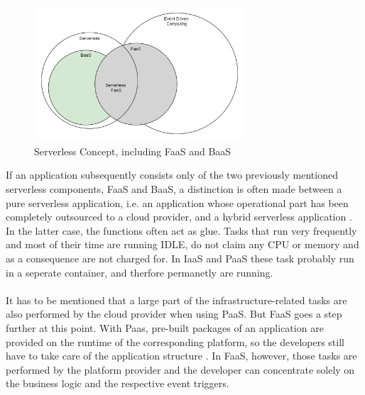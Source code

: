 \documentclass[11pt]{article}
\begin{document}
\begin{figure}[H]
\caption{Serverless Concept, including FaaS and BaaS}
\label{fig:serverlessBaaSandPaas}
\centering
\includegraphics[width=0.7\textwidth]{Serverless}
\end{figure} 
If an application subsequently consists only of the two previously mentioned serverless components, FaaS and BaaS, a distinction is often made between a pure serverless application, i.e. an application whose operational part has been completely outsourced to a cloud provider, and a hybrid serverless application \cite{leitner2019mixed}. In the latter case, the functions often act as glue. Tasks that run very frequently and most of their time are running IDLE, do not claim any CPU or memory and as a consequence are not charged for. In IaaS and PaaS these task probably run in a seperate container, and therfore permanetly are running. \\\\  
It has to be mentioned that a large part of the infrastructure-related tasks are also performed by the cloud provider when using PaaS. But FaaS goes a step further at this point. With Paas, pre-built packages of an application are provided on the runtime of the corresponding platform, so the developers still have to take care of the application structure \cite{kaplan2019framework}. In FaaS, however, those tasks are performed by the platform provider and the developer can concentrate solely on the business logic and the respective event triggers. \\\\
\end{document}
